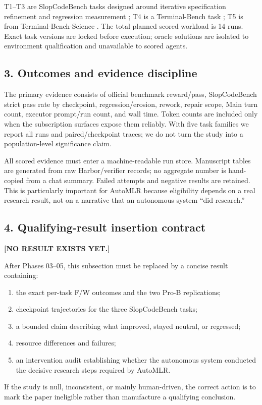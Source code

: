 \documentclass{article}
\begin{document}
T1--T3 are SlopCodeBench tasks designed around iterative specification refinement and regression measurement \citep{orlanski2026slopcodebench}; T4 is a Terminal-Bench task \citep{merrill2026terminalbench}; T5 is from Terminal-Bench-Science \citep{terminalbenchscience2026}. The total planned scored workload is 14 runs. Exact task versions are locked before execution; oracle solutions are isolated to environment qualification and unavailable to scored agents.

\subsection*{3. Outcomes and evidence discipline}
The primary evidence consists of official benchmark reward/pass, SlopCodeBench strict pass rate by checkpoint, regression/erosion, rework, repair scope, Main turn count, executor prompt/run count, and wall time. Token counts are included only when the subscription surfaces expose them reliably. With five task families we report all runs and paired/checkpoint traces; we do not turn the study into a population-level significance claim.

All scored evidence must enter a machine-readable run store. Manuscript tables are generated from raw Harbor/verifier records; no aggregate number is hand-copied from a chat summary. Failed attempts and negative results are retained. This is particularly important for AutoMLR because eligibility depends on a real research result, not on a narrative that an autonomous system ``did research.''

\subsection*{4. Qualifying-result insertion contract}
\textbf{[NO RESULT EXISTS YET.]}

After Phases 03--05, this subsection must be replaced by a concise result containing:
\begin{enumerate}
  \item the exact per-task F/W outcomes and the two Pro-B replications;
  \item checkpoint trajectories for the three SlopCodeBench tasks;
  \item a bounded claim describing what improved, stayed neutral, or regressed;
  \item resource differences and failures;
  \item an intervention audit establishing whether the autonomous system conducted the decisive research steps required by AutoMLR.
\end{enumerate}
If the study is null, inconsistent, or mainly human-driven, the correct action is to mark the paper ineligible rather than manufacture a qualifying conclusion.
\end{document}
